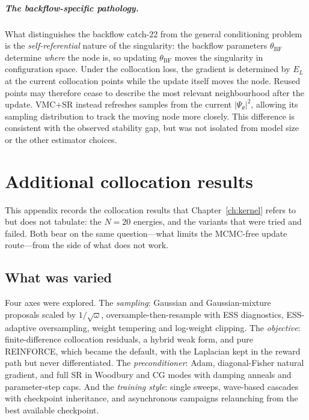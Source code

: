 \paragraph{The backflow-specific pathology.}
What distinguishes the backflow catch-22 from the general conditioning
problem is the \emph{self-referential} nature of the singularity:
the backflow parameters $\theta_{\mathrm{BF}}$ determine \emph{where}
the node is, so updating $\theta_{\mathrm{BF}}$ moves the singularity
in configuration space.
Under the collocation loss, the gradient is determined by $E_L$ at the current collocation
points while the update itself moves the node. Reused points may therefore cease to describe
the most relevant neighbourhood after the update. VMC+SR instead refreshes samples from the
current $|\Psi_\theta|^2$, allowing its sampling distribution to track the moving node more
closely. This difference is consistent with the observed stability gap, but was not isolated
from model size or the other estimator choices.


\chapter{Additional collocation results}
\label{app:postcatch22}

This appendix records the collocation results that Chapter~\ref{ch:kernel} refers to but does
not tabulate: the $N{=}20$ energies, and the variants that were tried and failed. Both bear on
the same question---what limits the MCMC-free update route---from the side of what does not
work.

\section{What was varied}
\label{app:postcatch22:programme}

Four axes were explored. The \emph{sampling}: Gaussian and Gaussian-mixture proposals scaled
by $1/\sqrt\omega$, oversample-then-resample with ESS diagnostics, ESS-adaptive oversampling,
weight tempering and log-weight clipping. The \emph{objective}: finite-difference collocation
residuals, a hybrid weak form, and pure REINFORCE, which became the default, with the
Laplacian kept in the reward path but never differentiated. The \emph{preconditioner}: Adam,
diagonal-Fisher natural gradient, and full SR in Woodbury and CG modes with damping anneals
and parameter-step caps. And the \emph{training style}: single sweeps, wave-based cascades with
checkpoint inheritance, and asynchronous campaigns relaunching from the best available
checkpoint.

